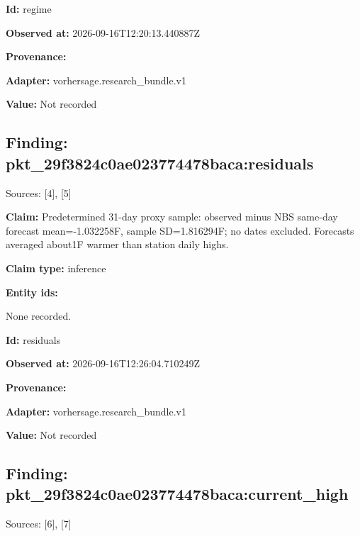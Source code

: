 \documentclass[11pt]{article}
\begin{document}
\par\noindent\textbf{Id:} regime

\par\noindent\textbf{Observed at:} 2026-09-16T12:20:13.440887Z

\par\noindent\textbf{Provenance:} \par \par\noindent\textbf{Adapter:} vorhersage.r\hspace{0pt}esearch\_bund\hspace{0pt}le.v1

\par\noindent\textbf{Value:} Not recorded

\subsection*{\textcolor{epdarkgreen}{Finding: pkt\_29f3824c\hspace{0pt}0ae023774478\hspace{0pt}baca:residua\hspace{0pt}ls}}
Sources: [4], [5]


\par\noindent\textbf{Claim:} Predetermined 31-day proxy sample: observed minus NBS same-day forecast mean=-1.032258F, sample SD=1.816294F; no dates excluded. Forecasts averaged about1F warmer than station daily highs.

\par\noindent\textbf{Claim type:} inference

\par\noindent\textbf{Entity ids:} \par None recorded.

\par\noindent\textbf{Id:} residuals

\par\noindent\textbf{Observed at:} 2026-09-16T12:26:04.710249Z

\par\noindent\textbf{Provenance:} \par \par\noindent\textbf{Adapter:} vorhersage.r\hspace{0pt}esearch\_bund\hspace{0pt}le.v1

\par\noindent\textbf{Value:} Not recorded

\subsection*{\textcolor{epdarkgreen}{Finding: pkt\_29f3824c\hspace{0pt}0ae023774478\hspace{0pt}baca:current\hspace{0pt}\_high}}
Sources: [6], [7]
\end{document}
